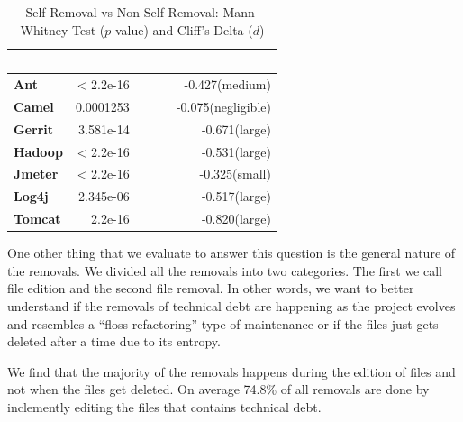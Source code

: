 \begin{table}[!tb]
	\begin{center}
		\caption{Self-Removal vs Non Self-Removal: Mann-Whitney Test ($p$-value) and Cliff's Delta ($d$)}
		\label{tbl:statistic}
		\begin{tabular}{l| rrr}
			\toprule
			\textbf{\thead{Project}} & \textbf{\thead{$p$-value}}&~~~ & \textbf{\thead{$d$}}\\ 
			\midrule
			\textbf{Ant   }   &  < 2.2e-16& ~~~  &  -0.427(medium)  \\  
			\textbf{Camel }   &  0.0001253& ~~~ &  -0.075(negligible)  \\  
			\textbf{Gerrit}   &  3.581e-14& ~~~ &  -0.671(large)  \\  
			\textbf{Hadoop}   &  < 2.2e-16& ~~~ &  -0.531(large)  \\  
			\textbf{Jmeter}   &  < 2.2e-16& ~~~ &  -0.325(small)  \\  
			\textbf{Log4j}   &  2.345e-06 & ~~~ &  -0.517(large)  \\  
			\textbf{Tomcat}   &  2.2e-16  & ~~~ &  -0.820(large) \\  
			\bottomrule
		\end{tabular}
	\end{center}    
\end{table}






One other thing that we evaluate to answer this question is the general nature of the removals. We divided all the removals into two categories. The first we call file edition and the second file removal. In other words, we want to better understand if the removals of technical debt are happening as the project evolves and resembles a ``floss refactoring'' type of maintenance or if the files just gets deleted after a time due to its entropy. 

We find that the majority of the removals happens during the edition of files and not when the files get deleted. On average 74.8\% of all removals are done by inclemently editing the files that contains technical debt.





